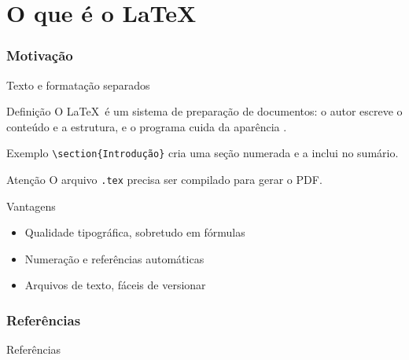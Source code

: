 \documentclass[../curso.tex]{subfiles}
\begin{document}
\part{O que é o \LaTeX}
\begin{refsection}       %

\section{Motivação}

\begin{frame}{Texto e formatação separados}
  \begin{block}{Definição}
    O \LaTeX\ é um sistema de preparação de documentos: o autor escreve o conteúdo e a
    estrutura, e o programa cuida da aparência \parencite{lamport1994}.
  \end{block}
  \begin{exampleblock}{Exemplo}
    \texttt{\textbackslash section\{Introdução\}} cria uma seção numerada e a inclui no sumário.
  \end{exampleblock}
  \begin{alertblock}{Atenção}
    O arquivo \texttt{.tex} precisa ser compilado para gerar o PDF.
  \end{alertblock}
\end{frame}

\begin{frame}{Vantagens}
  \begin{itemize}[<+->]
    \item Qualidade tipográfica, sobretudo em fórmulas
    \item Numeração e referências automáticas
    \item Arquivos de texto, fáceis de versionar
  \end{itemize}
\end{frame}

\section{Referências}

\begin{frame}[allowframebreaks]{Referências}
  \printbibliography[heading=none]
\end{frame}

\end{refsection}
\end{document}
